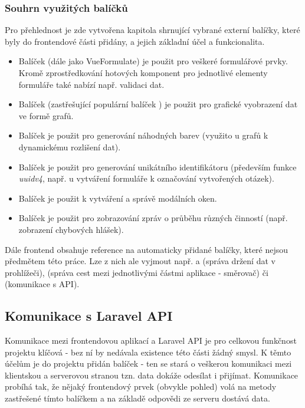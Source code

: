 		\subsubsection{Souhrn využitých balíčků}\label{sec:fe_packages}
		Pro přehlednost je zde vytvořena kapitola shrnující vybrané externí balíčky, které byly do frontendové části přidány, a jejich základní účel a funkcionalita.
		
		\begin{itemize}
			\item Balíček  (dále jako VueFormulate) je použit pro veškeré formulářové prvky. Kromě zprostředkování hotových komponent pro jednotlivé elementy formuláře také nabízí např. validaci dat.
			\item Balíček  (zastřešující populární balíček ) je použit pro grafické vyobrazení dat ve formě grafů.
			\item Balíček  je použit pro generování náhodných barev (využito u grafů k dynamickému rozlišení dat).
			\item Balíček  je použit pro generování unikátního identifikátoru (především funkce \textit{uuidv4}, např. u vytváření formuláře k označování vytvořených otázek).
			\item Balíček  je použit k vytváření a správě modálních oken.
			\item Balíček  je použit pro zobrazování zpráv o průběhu různých činností (např. zobrazení chybových hlášek).
		\end{itemize}
	
		Dále frontend obsahuje reference na automaticky přidané balíčky, které nejsou předmětem této práce. Lze z nich ale vyjmout např.  a  (správa držení dat v prohlížeči),  (správa cest mezi jednotlivými částmi aplikace - směrovač) či  (komunikace s API).
	
	\subsection{Komunikace s Laravel API}\label{sec:komunikace_s_api}
	Komunikace mezi frontendovou aplikací a Laravel API je pro celkovou funkčnost projektu klíčová - bez ní by nedávala existence této části žádný smysl. K těmto účelům je do projektu přidán balíček  - ten se stará o veškerou komunikaci mezi klientskou a serverovou stranou tzn. data dokáže odesílat i přijímat. Komunikace probíhá tak, že nějaký frontendový prvek (obvykle pohled) volá na metody zastřešené tímto balíčkem a na základě odpovědi ze serveru dostává data.
	
